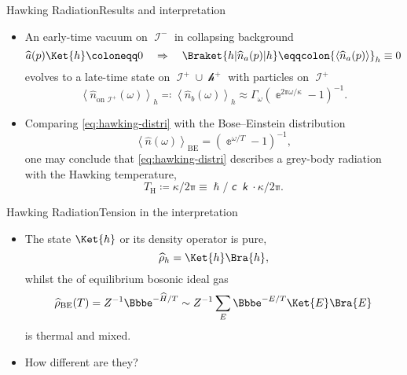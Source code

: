 \documentclass{beamer}
\newcommand{\ee}{{\Bbbe}}
\newcommand{\pp}{{\Bbbpi}}
\newcommand{\lc}{\mitsansc} %
\newcommand{\bk}{\mitsansk} %
\newcommand{\phs}{\hslash} %
\newcommand{\rbr}[1]{{\left(#1\right)}}
\newcommand{\abr}[1]{{\left<#1\right>}}
\newcommand{\rfun}[2]{{#1}\mathopen{}\left(#2\right)\mathclose{}}
\newcommand{\what}[1]{{\widehat{#1}}}
\begin{document}
\begin{frame}{Hawking Radiation}{Results and interpretation 
\cite{HAWKING1974,Hawking1975}}

\begin{itemize}
\item An early-time \alert{vacuum} on $\mscrI^-$ in collapsing background
\begin{equation}
\rfun{\what{a}}{p}\Ket{h} \coloneqq 0\quad\Rightarrow\quad
\Braket{h | \rfun{\what{n}_a}{p} | h} \eqqcolon \abr{\rfun{\what{n}_a}{p}}_h 
\equiv 0
\end{equation}
evolves to a late-time state on $\mscrI^+\cup\mscrh^+$ \alert{with particles} 
on $\mscrI^+$
\begin{equation}
\abr{\rfun{\what{n}_{\text{on }\mscrI^+}}{\omega}}_h \eqqcolon
\abr{\rfun{\what{n}_b}{\omega}}_h \approx
\Gamma_\omega\rbr{\ee^{2\pp\omega/\kappa}-1}^{-1}.
\label{eq:hawking-distri}
\end{equation}
\item Comparing \cref{eq:hawking-distri} with the Bose--Einstein distribution
\begin{equation}
\abr{\rfun{\what{n}}{\omega}}_\text{BE} = \rbr{\ee^{\omega/T} - 1}^{-1}, 
\end{equation}
one may conclude that \cref{eq:hawking-distri} describes a grey-body
radiation with the \alert{Hawking temperature},
\begin{equation}
T_\text{H} \coloneqq \kappa/2\pp \equiv \phs/\lc\bk \cdot \kappa/2\pp.
\end{equation}

\end{itemize}

\end{frame}


\begin{frame}{Hawking Radiation}{Tension in the interpretation}
\begin{itemize}
\item The state $\Ket{h}$ or its density operator is \alert{pure},
\begin{equation}
\what{\rho}_h = \Ket{h}\Bra{h},
\end{equation}
whilst the of equilibrium bosonic ideal gas
\begin{equation}
\rfun{\what{\rho}_\text{BE}}{T} = {Z}^{-1} \ee^{-\what{H}/T}
\sim Z^{-1} \sum_E \ee^{-E/T} \Ket{E}\Bra{E}
\end{equation}
is \alert{thermal} and \alert{mixed}.
\item How different are they? \cite{Kiefer2001,Hsu2009}
\end{itemize}
\end{frame}
\end{document}
